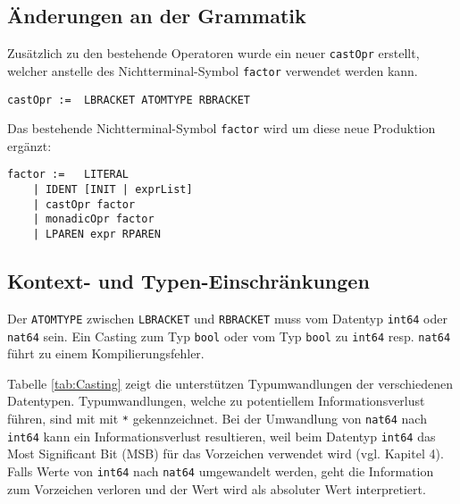\documentclass[10pt, a4paper, twocolumn]{article} %
\begin{document}
\subsection{Änderungen an der Grammatik}

Zusätzlich zu den bestehende Operatoren wurde ein neuer \texttt{castOpr} erstellt, welcher anstelle des Nichtterminal-Symbol \texttt{factor} verwendet werden kann.
\begin{lstlisting}[backgroundcolor = \color{lightgray},
xleftmargin = 0.05cm,
framexleftmargin = 0.05em]
    castOpr :=  LBRACKET ATOMTYPE RBRACKET
\end{lstlisting}
Das bestehende Nichtterminal-Symbol \texttt{factor} wird um diese neue Produktion ergänzt:
\begin{lstlisting}[backgroundcolor = \color{lightgray},
xleftmargin = 0.05cm,
framexleftmargin = 0.05em]
    factor :=   LITERAL
    | IDENT [INIT | exprList]
    | castOpr factor
    | monadicOpr factor
    | LPAREN expr RPAREN
\end{lstlisting}

\subsection{Kontext- und Typen-Einschränkungen}
Der \texttt{ATOMTYPE} zwischen \texttt{LBRACKET} und \texttt{RBRACKET} muss vom Datentyp \texttt{int64} oder \texttt{nat64} sein.
Ein Casting zum Typ \texttt{bool} oder vom Typ \texttt{bool} zu \texttt{int64} resp. \texttt{nat64} führt zu einem Kompilierungsfehler.

Tabelle \ref{tab:Casting} zeigt die unterstützen Typumwandlungen der verschiedenen Datentypen.
Typumwandlungen, welche zu potentiellem Informationsverlust führen, sind mit mit \texttt{*} gekennzeichnet.
Bei der Umwandlung von \texttt{nat64} nach \texttt{int64} kann ein Informationsverlust resultieren, weil beim Datentyp \texttt{int64} das Most Significant Bit (MSB) für das Vorzeichen verwendet wird (vgl. Kapitel 4). %
Falls Werte von \texttt{int64} nach \texttt{nat64} umgewandelt werden, geht die Information zum Vorzeichen verloren und der Wert wird als absoluter Wert interpretiert.
\begin{table}[h]
    \tiny
    \centering
    \caption{Casting zwischen Datentypen}
    \label{tab:Casting}
\end{table}
\end{document}
